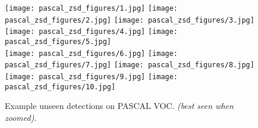 \documentclass[runningheads]{llncs}
\begin{document}
\begin{figure}
    \centering
    \texttt{[image: pascal\_zsd\_figures/1.jpg]}
    \texttt{[image: pascal\_zsd\_figures/2.jpg]}
    \texttt{[image: pascal\_zsd\_figures/3.jpg]}
    \texttt{[image: pascal\_zsd\_figures/4.jpg]}
    \texttt{[image: pascal\_zsd\_figures/5.jpg]} \\
    
    \texttt{[image: pascal\_zsd\_figures/6.jpg]}
    \texttt{[image: pascal\_zsd\_figures/7.jpg]}
    \texttt{[image: pascal\_zsd\_figures/8.jpg]}
    \texttt{[image: pascal\_zsd\_figures/9.jpg]}
    \texttt{[image: pascal\_zsd\_figures/10.jpg]}   \\

    \caption{Example unseen detections on PASCAL VOC. \emph{(best seen when zoomed)}.}
    \label{fig: qual_voc}
\end{figure}
\end{document}
